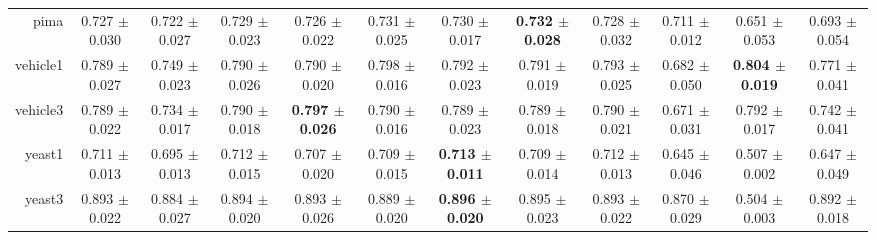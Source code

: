 \begin{table}[!ht]
{\begin{tabular}{r c c c c c c c c c c c}
pima & 0.727 $\pm$ 0.030 & 0.722 $\pm$ 0.027 & 0.729 $\pm$ 0.023 & 0.726 $\pm$ 0.022 & 0.731 $\pm$ 0.025 & 0.730 $\pm$ 0.017 & \textbf{0.732 $\pm$ 0.028} & 0.728 $\pm$ 0.032 & 0.711 $\pm$ 0.012 & 0.651 $\pm$ 0.053 & 0.693 $\pm$ 0.054 \\
vehicle1 & 0.789 $\pm$ 0.027 & 0.749 $\pm$ 0.023 & 0.790 $\pm$ 0.026 & 0.790 $\pm$ 0.020 & 0.798 $\pm$ 0.016 & 0.792 $\pm$ 0.023 & 0.791 $\pm$ 0.019 & 0.793 $\pm$ 0.025 & 0.682 $\pm$ 0.050 & \textbf{0.804 $\pm$ 0.019} & 0.771 $\pm$ 0.041 \\
vehicle3 & 0.789 $\pm$ 0.022 & 0.734 $\pm$ 0.017 & 0.790 $\pm$ 0.018 & \textbf{0.797 $\pm$ 0.026} & 0.790 $\pm$ 0.016 & 0.789 $\pm$ 0.023 & 0.789 $\pm$ 0.018 & 0.790 $\pm$ 0.021 & 0.671 $\pm$ 0.031 & 0.792 $\pm$ 0.017 & 0.742 $\pm$ 0.041 \\
yeast1 & 0.711 $\pm$ 0.013 & 0.695 $\pm$ 0.013 & 0.712 $\pm$ 0.015 & 0.707 $\pm$ 0.020 & 0.709 $\pm$ 0.015 & \textbf{0.713 $\pm$ 0.011} & 0.709 $\pm$ 0.014 & 0.712 $\pm$ 0.013 & 0.645 $\pm$ 0.046 & 0.507 $\pm$ 0.002 & 0.647 $\pm$ 0.049 \\
yeast3 & 0.893 $\pm$ 0.022 & 0.884 $\pm$ 0.027 & 0.894 $\pm$ 0.020 & 0.893 $\pm$ 0.026 & 0.889 $\pm$ 0.020 & \textbf{0.896 $\pm$ 0.020} & 0.895 $\pm$ 0.023 & 0.893 $\pm$ 0.022 & 0.870 $\pm$ 0.029 & 0.504 $\pm$ 0.003 & 0.892 $\pm$ 0.018 \\
\end{tabular}}
\end{table}
